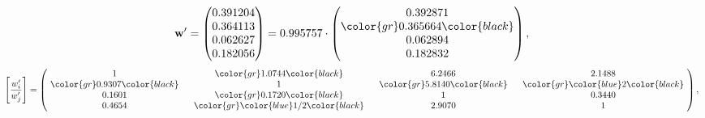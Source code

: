 \begin{example}
\begin{equation*}
\mathbf{w}^{\prime} =
\begin{pmatrix}
0.391204\\
0.364113\\
0.062627\\
0.182056
\end{pmatrix} =
0.995757\cdot
\begin{pmatrix}
0.392871\\
\color{gr} 0.365664\color{black} \\
0.062894\\
0.182832
\end{pmatrix},
\end{equation*}
\begin{equation*}
\left[ \frac{{w}^{\prime}_i}{{w}^{\prime}_j} \right] =
\begin{pmatrix}
$\,\,$ 1 $\,\,$ & $\,\,$\color{gr} 1.0744\color{black} $\,\,$ & $\,\,$6.2466$\,\,$ & $\,\,$2.1488$\,\,$ \\
$\,\,$\color{gr} 0.9307\color{black} $\,\,$ & $\,\,$ 1 $\,\,$ & $\,\,$\color{gr} 5.8140\color{black} $\,\,$ & $\,\,$\color{gr} \color{blue} 2\color{black}   $\,\,$ \\
$\,\,$0.1601$\,\,$ & $\,\,$\color{gr} 0.1720\color{black} $\,\,$ & $\,\,$ 1 $\,\,$ & $\,\,$0.3440 $\,\,$ \\
$\,\,$0.4654$\,\,$ & $\,\,$\color{gr} \color{blue}  1/2\color{black} $\,\,$ & $\,\,$2.9070$\,\,$ & $\,\,$ 1  $\,\,$ \\
\end{pmatrix},
\end{equation*}
\end{example}
\newpage
